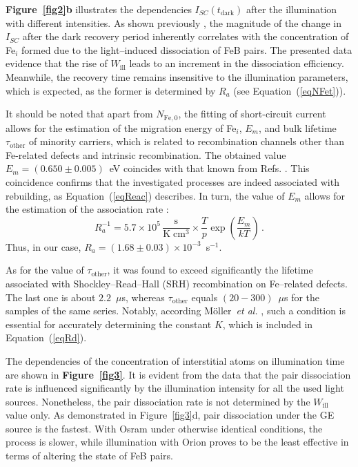 \documentclass{WileyMSP-template}
\begin{document}
\textbf{Figure~\ref{fig2}b} illustrates the dependencies $I_{SC}(t_\mathrm{dark})$ after the illumination with different intensities.
As shown previously \cite{Olikh2021JAP}, the magnitude of the change in $I_{SC}$ after the dark recovery period
inherently correlates with the concentration of Fe$_i$ formed due to the light--induced dissociation of FeB pairs.
The presented data evidence that the rise of $W_\mathrm{ill}$ leads to an increment in the dissociation efficiency.
Meanwhile, the recovery time remains insensitive to the illumination parameters, which is expected, as the former is determined by $R_a$ (see Equation~(\ref{eqNFet})).

It should be noted that apart from $N_\mathrm{Fe,0}$,
the fitting of short-circuit current \cite{Olikh2022:JMatSci,Olikh2021JAP} allows for the estimation of the migration energy of Fe$_i$, $E_m$,
and bulk lifetime $\tau_\mathrm{other}$ of minority carriers, which is related to recombination channels other than Fe-related defects and intrinsic recombination.
The obtained value $E_m=(0.650\pm0.005)$~eV coincides with that known from Refs. \cite{FeBKin2019,FeBAssSST2011,FeBkinAPL2008}.
This coincidence confirms that the investigated processes are indeed associated with rebuilding,
as Equation~(\ref{eqReac}) describes.
In turn, the value of $E_m$ allows for the estimation of the association rate \cite{FeBAssJAP2014,FeBKin2019,FeBAssSST2011}:
\begin{equation}
\label{eqTass}
R_a^{-1}=5.7\times10^5\,\frac{\mathrm{s}}{\mathrm{K}\;\mathrm{cm}^3}\times\frac{T}{p}\exp\left(\frac{E_m}{kT}\right)\,.
\end{equation}
Thus, in our case, $R_a=(1.68\pm0.03)\times10^{-3}$~s$^{-1}$.

As for the value of $\tau_\mathrm{other}$, it was found to exceed significantly the
lifetime associated with Shockley--Read--Hall (SRH) recombination on Fe--related defects.
The last one is about $2.2$~$\mu$s, whereas $\tau_\mathrm{other}$ equals $(20-300)$~$\mu$s for the samples of the same series.
Notably, according M\"{o}ller~\emph{et al.} \cite{FeBAssJAP2014},
such a condition is essential for accurately determining the constant $K$, which is included in Equation~(\ref{eqRd}).

The dependencies of the concentration of interstitial atoms on illumination time are shown in \textbf{Figure~\ref{fig3}}.
It is evident from the data that the pair dissociation rate is influenced significantly by the illumination intensity for all the used light sources.
Nonetheless, the pair dissociation rate is not determined by the $W_\mathrm{ill}$ value only.
As demonstrated in Figure~\ref{fig3}d, pair dissociation under the GE source is the fastest.
With Osram under otherwise identical conditions, the process is slower,
while illumination with Orion proves to be the least effective in terms of altering the state of FeB pairs.
\end{document}

